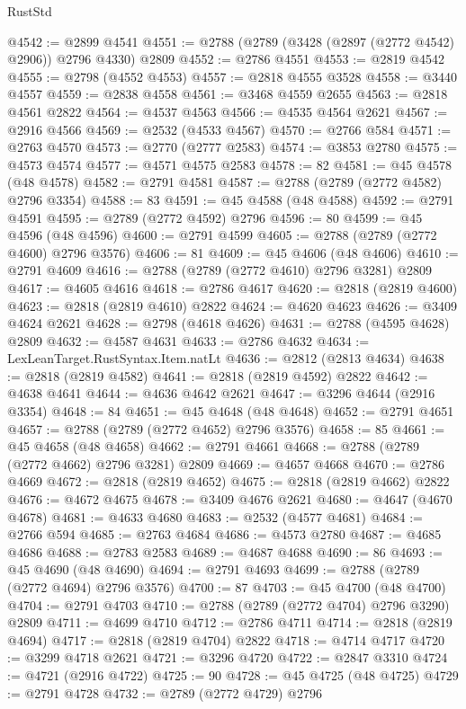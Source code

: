 \begin{lexlean}{RustStd}
\begin{coremodule}
@4542 := @2899 @4541
@4551 := @2788 (@2789 (@3428 (@2897 (@2772 @4542) @2906)) @2796 @4330) @2809
@4552 := @2786 @4551
@4553 := @2819 @4542
@4555 := @2798 (@4552 @4553)
@4557 := @2818 @4555 @3528
@4558 := @3440 @4557
@4559 := @2838 @4558
@4561 := @3468 @4559 @2655
@4563 := @2818 @4561 @2822
@4564 := @4537 @4563
@4566 := @4535 @4564 @2621
@4567 := @2916 @4566
@4569 := @2532 (@4533 @4567)
@4570 := @2766 @584
@4571 := @2763 @4570
@4573 := @2770 (@2777 @2583)
@4574 := @3853 @2780
@4575 := @4573 @4574
@4577 := @4571 @4575 @2583
@4578 := 82
@4581 := @45 @4578 (@48 @4578)
@4582 := @2791 @4581
@4587 := @2788 (@2789 (@2772 @4582) @2796 @3354)
@4588 := 83
@4591 := @45 @4588 (@48 @4588)
@4592 := @2791 @4591
@4595 := @2789 (@2772 @4592) @2796
@4596 := 80
@4599 := @45 @4596 (@48 @4596)
@4600 := @2791 @4599
@4605 := @2788 (@2789 (@2772 @4600) @2796 @3576)
@4606 := 81
@4609 := @45 @4606 (@48 @4606)
@4610 := @2791 @4609
@4616 := @2788 (@2789 (@2772 @4610) @2796 @3281) @2809
@4617 := @4605 @4616
@4618 := @2786 @4617
@4620 := @2818 (@2819 @4600)
@4623 := @2818 (@2819 @4610) @2822
@4624 := @4620 @4623
@4626 := @3409 @4624 @2621
@4628 := @2798 (@4618 @4626)
@4631 := @2788 (@4595 @4628) @2809
@4632 := @4587 @4631
@4633 := @2786 @4632
@4634 := LexLeanTarget.RustSyntax.Item.natLt
@4636 := @2812 (@2813 @4634)
@4638 := @2818 (@2819 @4582)
@4641 := @2818 (@2819 @4592) @2822
@4642 := @4638 @4641
@4644 := @4636 @4642 @2621
@4647 := @3296 @4644 (@2916 @3354)
@4648 := 84
@4651 := @45 @4648 (@48 @4648)
@4652 := @2791 @4651
@4657 := @2788 (@2789 (@2772 @4652) @2796 @3576)
@4658 := 85
@4661 := @45 @4658 (@48 @4658)
@4662 := @2791 @4661
@4668 := @2788 (@2789 (@2772 @4662) @2796 @3281) @2809
@4669 := @4657 @4668
@4670 := @2786 @4669
@4672 := @2818 (@2819 @4652)
@4675 := @2818 (@2819 @4662) @2822
@4676 := @4672 @4675
@4678 := @3409 @4676 @2621
@4680 := @4647 (@4670 @4678)
@4681 := @4633 @4680
@4683 := @2532 (@4577 @4681)
@4684 := @2766 @594
@4685 := @2763 @4684
@4686 := @4573 @2780
@4687 := @4685 @4686
@4688 := @2783 @2583
@4689 := @4687 @4688
@4690 := 86
@4693 := @45 @4690 (@48 @4690)
@4694 := @2791 @4693
@4699 := @2788 (@2789 (@2772 @4694) @2796 @3576)
@4700 := 87
@4703 := @45 @4700 (@48 @4700)
@4704 := @2791 @4703
@4710 := @2788 (@2789 (@2772 @4704) @2796 @3290) @2809
@4711 := @4699 @4710
@4712 := @2786 @4711
@4714 := @2818 (@2819 @4694)
@4717 := @2818 (@2819 @4704) @2822
@4718 := @4714 @4717
@4720 := @3299 @4718 @2621
@4721 := @3296 @4720
@4722 := @2847 @3310
@4724 := @4721 (@2916 @4722)
@4725 := 90
@4728 := @45 @4725 (@48 @4725)
@4729 := @2791 @4728
@4732 := @2789 (@2772 @4729) @2796

\end{coremodule}
\end{lexlean}
